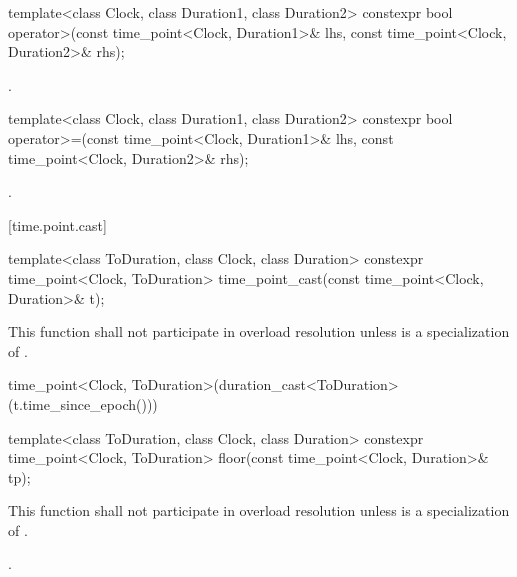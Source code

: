 %
\begin{itemdecl}
template<class Clock, class Duration1, class Duration2>
  constexpr bool operator>(const time_point<Clock, Duration1>& lhs,
                           const time_point<Clock, Duration2>& rhs);
\end{itemdecl}

\begin{itemdescr}
\pnum
\returns {}.
\end{itemdescr}

%
\begin{itemdecl}
template<class Clock, class Duration1, class Duration2>
  constexpr bool operator>=(const time_point<Clock, Duration1>& lhs,
                            const time_point<Clock, Duration2>& rhs);
\end{itemdecl}

\begin{itemdescr}
\pnum
\returns {}.
\end{itemdescr}

[time.point.cast]{}

%
%
\begin{itemdecl}
template<class ToDuration, class Clock, class Duration>
  constexpr time_point<Clock, ToDuration> time_point_cast(const time_point<Clock, Duration>& t);
\end{itemdecl}

\begin{itemdescr}
\pnum
\remarks This function shall not participate in overload resolution
unless  is a specialization of .

\pnum
\returns
\begin{codeblock}
time_point<Clock, ToDuration>(duration_cast<ToDuration>(t.time_since_epoch()))
\end{codeblock}
\end{itemdescr}

%
\begin{itemdecl}
template<class ToDuration, class Clock, class Duration>
  constexpr time_point<Clock, ToDuration> floor(const time_point<Clock, Duration>& tp);
\end{itemdecl}

\begin{itemdescr}
\pnum
\remarks This function shall not participate in overload resolution
unless  is a specialization of .

\pnum
\returns {}.
\end{itemdescr}

